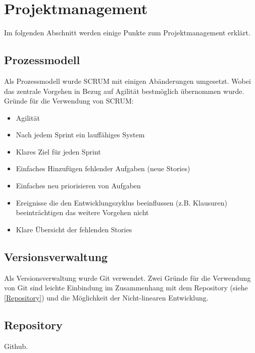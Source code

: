 \section{Projektmanagement}
Im folgenden Abschnitt werden einige Punkte zum Projektmanagement erklärt. 

\subsection{Prozessmodell}
Als Prozessmodell wurde SCRUM mit einigen Abänderungen umgesetzt. Wobei das zentrale Vorgehen in Bezug auf Agilität bestmöglich übernommen wurde. Gründe für die Verwendung von SCRUM:

\begin{itemize}
	\item Agilität
	\item Nach jedem Sprint ein lauffähiges System
	\item Klares Ziel für jeden Sprint
	\item Einfaches Hinzufügen fehlender Aufgaben (neue Stories)
	\item Einfaches neu priorisieren von Aufgaben
	\item Ereignisse die den Entwicklungszyklus beeinflussen (z.B. Klausuren) beeinträchtigen das weitere Vorgehen nicht
	\item Klare Übersicht der fehlenden Stories
\end{itemize}

\subsection{Versionsverwaltung}
Als Versionsverwaltung wurde Git verwendet. Zwei Gründe für die Verwendung von Git sind leichte Einbindung im Zusammenhang mit dem Repository (siehe \ref{Repository}) und die Möglichkeit der Nicht-linearen Entwicklung.

\subsection{Repository}
Github.

\pagebreak 